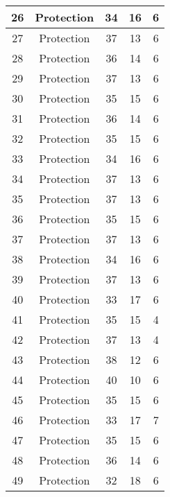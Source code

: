 \documentclass[results.tex]{subfiles}
\begin{document}
\begin{center}
\begin{tabular}{| c || c | c | c | c |}
    \hline
    26 & Protection & 34 & 16 & 6 \\ 
    \hline
    27 & Protection & 37 & 13 & 6 \\ 
    \hline
    28 & Protection & 36 & 14 & 6 \\ 
    \hline
    29 & Protection & 37 & 13 & 6 \\ 
    \hline
    30 & Protection & 35 & 15 & 6 \\ 
    \hline
    31 & Protection & 36 & 14 & 6 \\ 
    \hline
    32 & Protection & 35 & 15 & 6 \\ 
    \hline
    33 & Protection & 34 & 16 & 6 \\ 
    \hline
    34 & Protection & 37 & 13 & 6 \\ 
    \hline
    35 & Protection & 37 & 13 & 6 \\ 
    \hline
    36 & Protection & 35 & 15 & 6 \\ 
    \hline
    37 & Protection & 37 & 13 & 6 \\ 
    \hline
    38 & Protection & 34 & 16 & 6 \\ 
    \hline
    39 & Protection & 37 & 13 & 6 \\ 
    \hline
    40 & Protection & 33 & 17 & 6 \\ 
    \hline
    41 & Protection & 35 & 15 & 4 \\ 
    \hline
    42 & Protection & 37 & 13 & 4 \\ 
    \hline
    43 & Protection & 38 & 12 & 6 \\ 
    \hline
    44 & Protection & 40 & 10 & 6 \\ 
    \hline
    45 & Protection & 35 & 15 & 6 \\ 
    \hline
    46 & Protection & 33 & 17 & 7 \\ 
    \hline
    47 & Protection & 35 & 15 & 6 \\ 
    \hline
    48 & Protection & 36 & 14 & 6 \\ 
    \hline
    49 & Protection & 32 & 18 & 6 \\ 
    \hline   \end{tabular}
\end{center}
\end{document}
